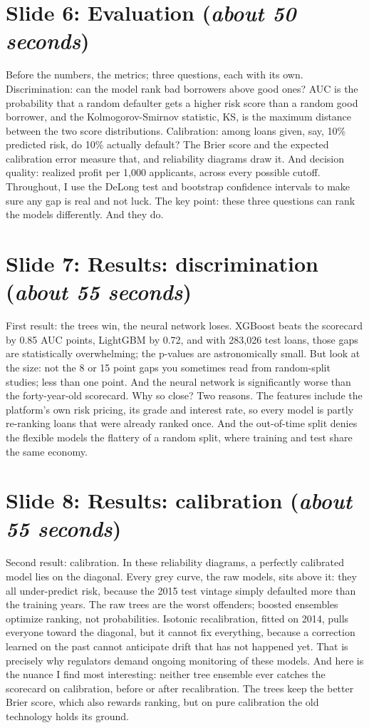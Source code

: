 \documentclass[a4paper,11pt]{article}
\newcommand{\slideblock}[3]{%
  \section*{Slide #1: #2 \hfill \normalfont\small(\textit{#3})}}
\begin{document}
\slideblock{6}{Evaluation}{about 50 seconds}
Before the numbers, the metrics; three questions, each with its own. Discrimination: can the model rank bad borrowers above good ones? AUC is the probability that a random defaulter gets a higher risk score than a random good borrower, and the Kolmogorov-Smirnov statistic, KS, is the maximum distance between the two score distributions. Calibration: among loans given, say, 10\% predicted risk, do 10\% actually default? The Brier score and the expected calibration error measure that, and reliability diagrams draw it. And decision quality: realized profit per 1,000 applicants, across every possible cutoff. Throughout, I use the DeLong test and bootstrap confidence intervals to make sure any gap is real and not luck. The key point: these three questions can rank the models differently. And they do.

\slideblock{7}{Results: discrimination}{about 55 seconds}
First result: the trees win, the neural network loses. XGBoost beats the scorecard by 0.85 AUC points, LightGBM by 0.72, and with 283,026 test loans, those gaps are statistically overwhelming; the p-values are astronomically small. But look at the size: not the 8 or 15 point gaps you sometimes read from random-split studies; less than one point. And the neural network is significantly worse than the forty-year-old scorecard. Why so close? Two reasons. The features include the platform's own risk pricing, its grade and interest rate, so every model is partly re-ranking loans that were already ranked once. And the out-of-time split denies the flexible models the flattery of a random split, where training and test share the same economy.

\slideblock{8}{Results: calibration}{about 55 seconds}
Second result: calibration. In these reliability diagrams, a perfectly calibrated model lies on the diagonal. Every grey curve, the raw models, sits above it: they all under-predict risk, because the 2015 test vintage simply defaulted more than the training years. The raw trees are the worst offenders; boosted ensembles optimize ranking, not probabilities. Isotonic recalibration, fitted on 2014, pulls everyone toward the diagonal, but it cannot fix everything, because a correction learned on the past cannot anticipate drift that has not happened yet. That is precisely why regulators demand ongoing monitoring of these models. And here is the nuance I find most interesting: neither tree ensemble ever catches the scorecard on calibration, before or after recalibration. The trees keep the better Brier score, which also rewards ranking, but on pure calibration the old technology holds its ground.
\end{document}
